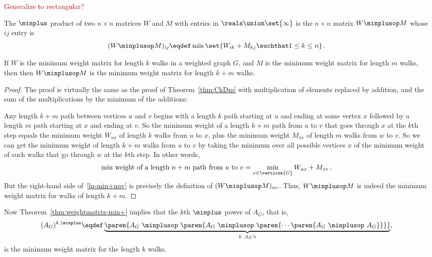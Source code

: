 \begin{editingnotes}
\textcolor{red}{Generalize to rectangular?}

\begin{definition}\label{def:minplus}
  The $\minplus$ product of two $n\times n$ matrices $W$ and $M$ with
  entries in $\reals\union \set{\infty}$ is the $n \times n$ matrix
  $W\minplusop M$ whose $ij$ entry is
\[
(W\minplusop M )_{ij} \eqdef \min \set{W_{ik} + M_{kj} \suchthat 1 \leq k \leq n}\, .
\]
\end{definition}

\begin{theorem}\label{thm:weightmatrix-min+}
  If $W$ is the minimum weight matrix for length $k$ walks in a weighted
  graph $G$, and $M$ is the minimum weight matrix for length $m$ walks,
  then then $W\minplusop M$ is the minimum weight matrix for length $k+m$
  walks.
\end{theorem}

\begin{proof}
  The proof is virtually the same as the proof of Theorem~\ref{thm:CkDm}
  with multiplication of elements replaced by addition, and the sum of the
  multiplications by the minimum of the additions:

  Any length $k+m$ path between vertices $u$ and $v$ begins with a length
  $k$ path starting at $u$ and ending at some vertex $x$ followed by a
  length $m$ path starting at $x$ and ending at $v$.  So the minimum
  weight of a length $k+m$ path from $u$ to $v$ that goes through $x$ at
  the $k$th step equals the minimum weight $W_{ux}$ of length $k$ walks
  from $u$ to $x$, plus the minimum weight $M_{xv}$ of length $m$ walks
  from $w$ to $v$.  So we can get the minimum weight of length $k+m$ walks
  from $u$ to $v$ by taking the minimum over all possible vertices $x$ of
  the minimum weight of such walks that go through $w$ at the $k$th step.
  In other words,
\begin{equation}\label{ln-min+nuv}
\text{min weight of a length $n+m$ path from $u$ to $v$} =
              \min_{x \in \vertices{G}} W_{ux}+M_{xv}\, .
\end{equation}
But the right-hand side of~\eqref{ln-min+nuv} is precisely the definition of
$(W\minplusop M)_{uv}$.  Thus, $W\minplusop M$ is indeed the minimum weight
matrix for walks of length $k+m$.
\end{proof}

Now Theorem~\ref{thm:weightmatrix-min+} implies that the $k$th $\minplus$ power
of $A_G$, that is,
\[
(A_G)^{k, \minplus} \eqdef \underbrace{\paren{A_G\ \minplusop\ \paren{A_G\
      \minplusop\ \paren{\cdots \paren{A_G\ \minplusop\ A_G}} }}}_{k\ A_G\text{'s}},
\]
is the minimum weight matrix for the length $k$ walks.


\end{editingnotes}
